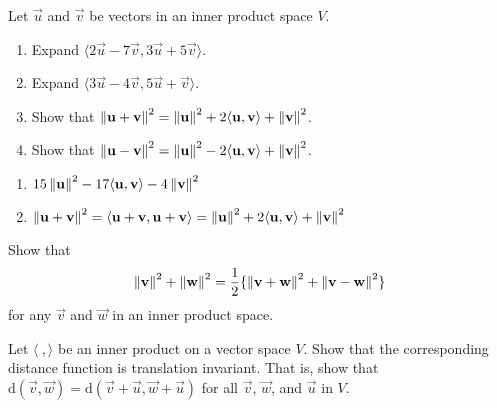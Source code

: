 \documentclass{ximera}
\begin{document}
\begin{problem}\label{prob:inner_prod_22}
Let $\vec{u}$ and $\vec{v}$ be vectors in an inner product space $V$.

\begin{enumerate} 
\item Expand $\langle2\vec{u} - 7\vec{v}, 3\vec{u} + 5\vec{v} \rangle$.

\item Expand $\langle3\vec{u} - 4\vec{v}, 5\vec{u} + \vec{v} \rangle$.

\item Show that $\left\lVert \mathbf{u} + \mathbf{v} \right\rVert ^2 = \left\lVert \mathbf{u} \right\rVert ^2 + 2 \langle \mathbf{u}, \mathbf{v} \rangle + \left\lVert \mathbf{v} \right\rVert ^2 $.

\item Show that $\left\lVert \mathbf{u} - \mathbf{v} \right\rVert ^2 = \left\lVert \mathbf{u} \right\rVert ^2 - 2 \langle \mathbf{u}, \mathbf{v} \rangle +
\left\lVert \mathbf{v} \right\rVert ^2$.

\end{enumerate}
\begin{hint}
\begin{enumerate} 
 
\item  $15\left\lVert\mathbf{u}\right\rVert^{2} - 17 \langle \mathbf{u}, \mathbf{v} \rangle - 4\left\lVert\mathbf{v}\right\rVert^{2}$

\item  $\left\lVert\mathbf{u} + \mathbf{v}\right\rVert^{2} = \langle \mathbf{u} + \mathbf{v}, \mathbf{u} + \mathbf{v} \rangle = \left\lVert\mathbf{u}\right\rVert^{2} + 2\langle \mathbf{u}, \mathbf{v}\rangle + \left\lVert\mathbf{v}\right\rVert^{2}$

\end{enumerate}
\end{hint}
\end{problem}

\begin{problem}\label{prob:inner_prod_23}
Show that
\begin{equation*}
\left\lVert \mathbf{v} \right\rVert ^2 +
\left\lVert \mathbf{w} \right\rVert ^2 = \frac{1}{2} \{
\left\lVert \mathbf{v} + \mathbf{w} \right\rVert ^2 +
\left\lVert \mathbf{v} - \mathbf{w} \right\rVert ^2\}
\end{equation*}
for any $\vec{v}$ and $\vec{w}$ in an inner product space.
\end{problem}

\begin{problem}\label{prob:inner_prod_24}
Let $\langle\ , \rangle$ be an inner product on a vector space $V$. Show that the corresponding distance function is translation invariant. That is, show that \newline $\mbox{d}(\vec{v}, \vec{w}) = \mbox{d}(\vec{v} + \vec{u}, \vec{w} + \vec{u})$ for all $\vec{v}$, $\vec{w}$, and $\vec{u}$ in $V$.
\end{problem}
\end{document}
